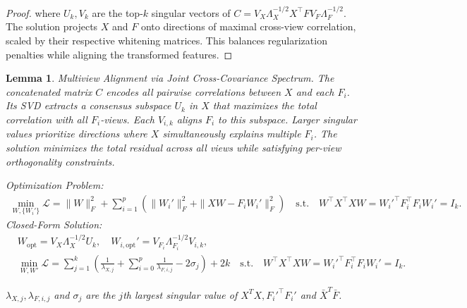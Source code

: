 \documentclass{article}
\newtheorem{lemma}{Lemma} %
\begin{document}
\begin{proof}
where \( U_k, V_k \) are the top-\(k \) singular vectors of \( C = V_X\Lambda_X^{-1/2} X^\top F V_F\Lambda_F^{-1/2} \). The solution projects \( X \) and \( F \) onto directions of maximal cross-view correlation, scaled by their respective whitening matrices. This balances regularization penalties while aligning the transformed features.  
\end{proof}

    
\begin{lemma}\label{lem:multiCCA}
Multiview Alignment via Joint Cross-Covariance Spectrum.
The concatenated matrix \( C \) encodes all pairwise correlations between \( X \) and each \( F_i \). Its SVD extracts a consensus subspace \( U_k \) in \( X \) that maximizes the total correlation with all \( F_i \)-views. Each \( V_{i,k} \) aligns \( F_i \) to this subspace. Larger singular values prioritize directions where \( X \) simultaneously explains multiple \( F_i \). The solution minimizes the total residual across all views while satisfying per-view orthogonality constraints.

Optimization Problem:  
\begin{equation}
\begin{aligned}
\min_{W, \{W_i'\}} \mathcal{L} = \|W\|_F^2 + \sum_{i=1}^p \left( \|W_i'\|_F^2 + \|XW - F_i W_i'\|_F^2 \right) \quad \text{s.t.} \quad W^\top X^\top X W = W_i'^\top F_i^\top F_i W_i' = I_k.
\end{aligned}
\end{equation}  
Closed-Form Solution:  
\begin{equation}
\begin{aligned}
& W_{\text{opt}} = V_X\Lambda_X^{-1/2} U_k, \quad W_{i,\text{opt}}' = V_{F_i}\Lambda_{F_i}^{-1/2} V_{i,k}, \\
& \min_{W, W'} \mathcal{L} = \sum_{j=1}^{k} ( \frac{1}{\lambda_{X,j}} + \sum_{i=0}^p \frac{1}{\lambda_{F,i,j}} - 2 \sigma_j ) + 2k \quad \text{s.t.} \quad W^\top X^\top X W = W_i'^\top F_i^\top F_i W_i' = I_k.
\end{aligned}
\end{equation}  

$\lambda_{X,j}, \lambda_{F,i,j}$ and $\sigma_j$ are the $j$th largest singular value of $X^TX, F_i'^\top F_i'$ and $\bar{X}^T \bar{F}$.

\end{lemma}
\end{document}
